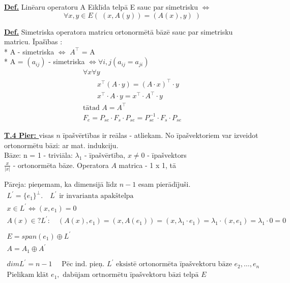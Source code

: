 \documentclass[12pt]{article}
\begin{document}
\textbf{\underline{Def.}} Linēaru operatoru A Eiklīda telpā E sauc par simetrisku $\Leftrightarrow$
$$
\forall x,y \in E ( \; (x,A(y))  =  (A(x),y) \;)
$$

\textbf{\underline{Def.}} Simetriska operatora matricu ortonormētā bāzē sauc par simetrisku matricu.
Īpašības : \\
* A - simetriska  $\Leftrightarrow$ $A^{\intercal}$ = A \\
* A = $(a_{ij})$ - simetriska $\Leftrightarrow \forall i,j (a_{ij} = a_{ji})$  \\

\begin{gather*}
	\forall x \forall y \\
	\quad \quad x^{\intercal} (A \cdot y) = (A \cdot x)^{\intercal} \cdot y \\
	\quad \quad x^{\intercal} \cdot A \cdot y = x^{\intercal} \cdot A^{\intercal} \cdot y \\
	\text{tātad } A = A^{\intercal}
	\\
	F_e = P_{se} \cdot F_s \cdot P_{se}  = P_{se}^{-1} \cdot F_s \cdot P_{se}
\end{gather*}

\pagebreak

\textbf{\underline{T.4 Pier: }}  visas $n$ īpašvērtības ir reālas - atliekam. No īpašvektoriem var izveidot ortonormētu bāzi: ar mat. indukciju. \\

Bāze: n = 1 - triviāla: $\lambda_1$ - īpašvērtība, $x \neq 0$ - īpašvektors \\

$\frac{x}{|x|}$ - ortonormēta bāze.  Operatora $A$ matrica - 1 x 1, tā %

Pāreja: pieņemam, ka dimensijā līdz $n - 1$ esam pierādījuši. \\
\begin{gather*}
	L^{'} = \{e_1\}^\bot. \quad L^{'} \text{ ir invarianta apakštelpa} \\
	x \in L^{'} \Leftrightarrow (x, e_1) = 0 \\
	A(x) \in ? L^{'} : \quad (A(x), e_1) = (x, A(e_1)) = (x, \lambda_1 \cdot e_1) = \lambda_1 \cdot (x, e_1) =  \lambda_1 \cdot 0 = 0 \\ %
	\\
	E = span(e_1) \oplus L^{'} \\
	A = A_1 \oplus A^{'} \\
	\\
	dimL^{'} = n - 1 \quad  \text{ Pēc ind. pieņ. } L^{'} \text{ eksistē ortonormēta īpašvektoru bāze } e_2, \ldots, e_n \\
	\text{Pielikam klāt } e_1, \text{ dabūjam ortnormētu īpašvektoru bāzi telpā } E
\end{gather*}
\end{document}
